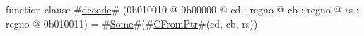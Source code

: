 function clause #\hyperref[zdecode]{decode}# (0b010010 @ 0b00000 @ cd : regno @ cb : regno @ rs : regno @ 0b010011) = #\hyperref[zSome]{Some}#(#\hyperref[zCFromPtr]{CFromPtr}#(cd, cb, rs))
